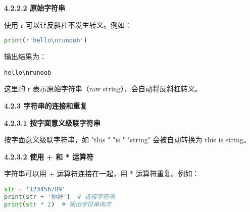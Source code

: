 \textbf{4.2.2.2 原始字符串}

使用 r 可以让反斜杠不发生转义。例如：

\begin{lstlisting}[language=python]
print(r'hello\nrunoob')
\end{lstlisting}

输出结果为：

\begin{lstlisting}[language=pythonC]
hello\nrunoob
\end{lstlisting}

这里的 r 表示原始字符串（raw string），会自动将反斜杠转义。

\textbf{4.2.3 字符串的连接和重复}

\textbf{4.2.3.1 按字面意义级联字符串}

按字面意义级联字符串，如 "this " "is " "string" 会被自动转换为 this is string。

\textbf{4.2.3.2 使用 + 和 * 运算符}

字符串可以用 + 运算符连接在一起，用 * 运算符重复。例如：

\begin{lstlisting}[language=python]
str = '123456789'
print(str + '你好')  # 连接字符串
print(str * 2)  # 输出字符串两次
\end{lstlisting}
